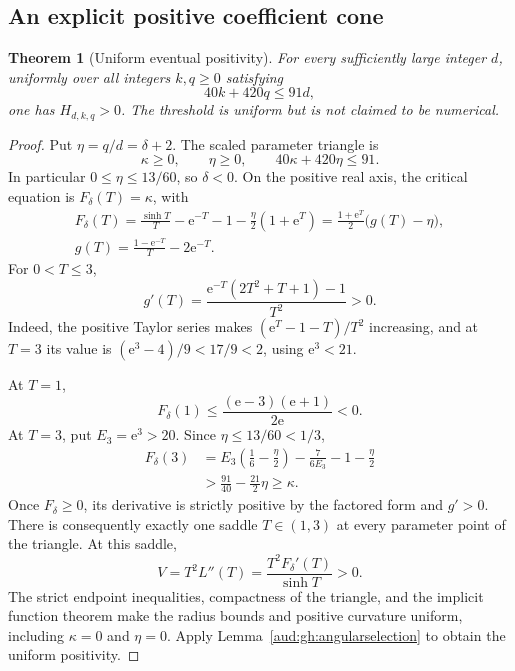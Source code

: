 \documentclass[11pt,a4paper]{article}
\numberwithin{equation}{section}
\newtheorem{theorem}{Theorem}[section]
\begin{document}
\subsection{An explicit positive coefficient cone}\label{aud:gh:conesection}
\begin{theorem}[Uniform eventual positivity]\label{aud:gh:positivecone}
For every sufficiently large integer $d$, uniformly over all integers
$k,q\ge0$ satisfying
\begin{equation}\label{aud:gh:coneinequality}
 40k+420q\le91d,
\end{equation}
one has $H_{d,k,q}>0$.  The threshold is uniform but is not claimed to be
numerical.
\end{theorem}
\begin{proof}
Put $\eta=q/d=\delta+2$.  The scaled parameter triangle is
\[
 \kappa\ge0,\qquad\eta\ge0,\qquad40\kappa+420\eta\le91.
\]
In particular $0\le\eta\le13/60$, so $\delta<0$.  On the positive real axis,
the critical equation is $F_\delta(T)=\kappa$, with
\begin{gather*}
 F_\delta(T)=\frac{\sinh T}{T}-\mathrm e^{-T}-1
                  -\frac\eta2(1+\mathrm e^T)
             =\frac{1+\mathrm e^T}{2}\bigl(g(T)-\eta\bigr),\\
 g(T)=\frac{1-\mathrm e^{-T}}{T}-2\mathrm e^{-T}.
\end{gather*}
For $0<T\le3$,
\[
 g'(T)=\frac{\mathrm e^{-T}(2T^2+T+1)-1}{T^2}>0.
\]
Indeed, the positive Taylor series makes $(\mathrm e^T-1-T)/T^2$ increasing, and
at $T=3$ its value is $(\mathrm e^3-4)/9<17/9<2$, using $\mathrm e^3<21$.

At $T=1$,
\[
 F_\delta(1)\le\frac{(\mathrm e-3)(\mathrm e+1)}{2\mathrm e}<0.
\]
At $T=3$, put $E_3=\mathrm e^3>20$.  Since $\eta\le13/60<1/3$,
\begin{align*}
 F_\delta(3)
 &=E_3\left(\frac16-\frac\eta2\right)-\frac7{6E_3}-1-\frac\eta2\\
 &>\frac{91}{40}-\frac{21}{2}\eta\ge\kappa.
\end{align*}
Once $F_\delta\ge0$, its derivative is strictly positive by the factored
form and $g'>0$.  There is consequently exactly one saddle $T\in(1,3)$
at every parameter point of the triangle.  At this saddle,
\[
 V=T^2L''(T)=\frac{T^2F_\delta'(T)}{\sinh T}>0.
\]
The strict endpoint inequalities, compactness of the triangle, and the
implicit function theorem make the radius bounds and positive curvature
uniform, including $\kappa=0$ and $\eta=0$.  Apply
Lemma~\ref{aud:gh:angularselection} to obtain the uniform positivity.
\end{proof}
\end{document}
